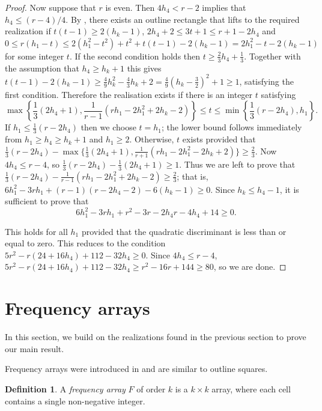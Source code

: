 \documentclass{sn-jnl}
\theoremstyle{definition}
\newtheorem{definition}[theorem]{Definition}
\begin{document}
\begin{proof}
Now suppose that $r$ is even. Then $4h_4 < r-2$ implies that $h_4 \le (r-4)/4$. By , there exists an outline rectangle that lifts to the required realization if $t(t-1)\ge 2(h_k-1)$, $2h_4+2 \le 3t+1 \le r+1-2h_4$ and $0 \le r(h_1-t) \le 2(h_1^2-t^2) + t^2 + t(t-1)-2(h_k-1) = 2h_1^2 - t - 2(h_k-1)$ for some integer $t$. 
If the second condition holds then $t\geq \frac{2}{3}h_4+\frac{1}{3}$. Together with the assumption that $h_4\geq h_k+1$ this gives 
$t(t-1) - 2(h_k-1) \geq \frac{4}{9}h_k^2-\frac{4}{3}h_k+2 = \frac{4}{9}(h_k-\frac{3}{2})^2+1\geq 1$, satisfying the first condition.
Therefore the realisation exists if there is an integer $t$ satisfying 
$$\max\left\{\frac{1}{3}(2h_4+1),\frac{1}{r-1}(rh_1-2h_1^2+2h_k-2) \right\}\leq t\leq \min\left\{ \frac{1}{3}(r-2h_4), h_1 \right\}.$$
If $h_1 \le \frac{1}{3}(r-2h_4)$ then we choose $t=h_1$; the lower bound follows immediately from $h_1 \ge h_4 \ge h_k+1$ and $h_1 \ge 2$. 
Otherwise, $t$ exists provided that 
$\frac{1}{3}(r-2h_4) - \max\{\frac{1}{3}(2h_4+1),\frac{1}{r+1}(rh_1-2h_1^2-2h_k+2) \} \ge \frac{2}{3}$.
Now $4h_4 \leq r-4$, so $\frac{1}{3}(r-2h_4) - \frac{1}{3}(2h_4+1) \geq 1$. Thus we are left to prove that
$\frac{1}{3}(r-2h_4) - \frac{1}{r-1}(rh_1-2h_1^2+2h_k-2) \geq \frac{2}{3}$; that is,
$6h_1^2-3rh_1+(r-1)(r-2h_4-2) -6(h_k-1) \geq 0.$
Since $h_k \le h_4-1$, it is sufficient to prove that
$$6h_1^2-3rh_1+r^2-3r-2h_4r-4h_4+14 \geq 0.$$

This holds for all $h_1$ provided that the quadratic discriminant is less than or equal to zero. This reduces to the condition
$5r^2-r(24+16h_4)+112-32h_4 \geq 0$.
Since $4h_4 \le r-4$, $5r^2-r(24+16h_4)+112-32h_4 \ge r^2 -16r +144 \ge 80$, so we are done.
\end{proof}



\section{Frequency arrays}

In this section, we build on the realizations found in the previous section to prove our main result.

Frequency arrays were introduced in \cite{kemp2025further} and are similar to outline squares.

\begin{definition}
    A \emph{frequency array} $F$ of order $k$ is a $k\times k$ array, where each cell contains a single non-negative integer.
\end{definition}
\end{document}
